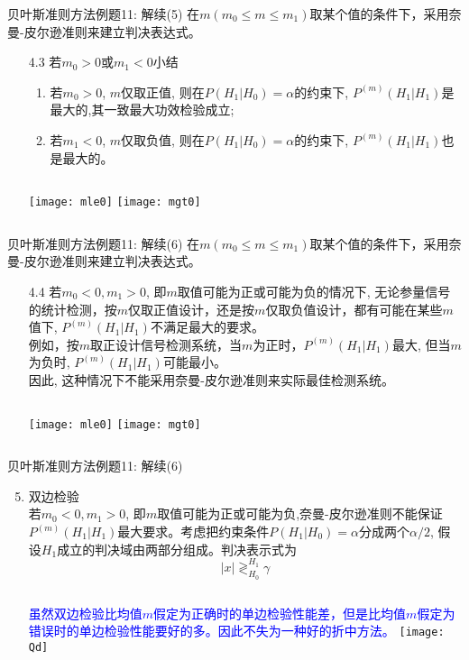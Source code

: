 \begin{frame}[shrink]{贝叶斯准则方法例题11: 解续(5)}
在$m(m_0\le m\le m_1)$取某个值的条件下，采用奈曼-皮尔逊准则来建立判决表达式。
\begin{enumerate}
	\item[4.3] 若$m_0>0$或$m_1<0$小结
	\begin{enumerate}
		\item 若$m_0>0$, $m$仅取正值, 则在$P(H_1|H_0)=\alpha$的约束下, $P^{(m)}(H_1|H_1)$是最大的,其一致最大功效检验成立;
		\item 若$m_1<0$, $m$仅取负值, 则在$P(H_1|H_0)=\alpha$的约束下, $P^{(m)}(H_1|H_1)$也是最大的。
	\end{enumerate}
	\begin{columns}
		\texttt{[image: mle0]}
		\texttt{[image: mgt0]}
	\end{columns}
\end{enumerate} 
\end{frame}

\begin{frame}[shrink]{贝叶斯准则方法例题11: 解续(6)}
在$m(m_0\le m\le m_1)$取某个值的条件下，采用奈曼-皮尔逊准则来建立判决表达式。
\begin{enumerate}
	\item[4.4] 若$m_0<0,m_1>0$, 即$m$取值可能为正或可能为负的情况下, 无论参量信号的统计检测，按$m$仅取正值设计，还是按$m$仅取负值设计，都有可能在某些$m$值下,   $P^{(m)}(H_1|H_1)$不满足最大的要求。\\
	例如，按$m$取正设计信号检测系统，当$m$为正时，$P^{(m)}(H_1|H_1)$最大, 但当$m$为负时, $P^{(m)}(H_1|H_1)$可能最小。\\
	因此, 这种情况下不能采用奈曼-皮尔逊准则来实际最佳检测系统。
	\begin{columns}
		\column{0.4\textwidth}
		\texttt{[image: mle0]}
		\column{0.4\textwidth}
		\texttt{[image: mgt0]}
	\end{columns}
\end{enumerate} 
\end{frame}

\begin{frame}[shrink]{贝叶斯准则方法例题11: 解续(6)}
\begin{enumerate}
	\setcounter{enumi}{4} %
	\item 双边检验\\
	若$m_0<0,m_1>0$, 即$m$取值可能为正或可能为负,奈曼-皮尔逊准则不能保证$P^{(m)}(H_1|H_1)$最大要求。考虑把约束条件$P(H_1|H_0)=\alpha$分成两个$\alpha/2$, 假设$H_1成立$的判决域由两部分组成。判决表示式为
	\[|x|\mathop{\gtrless}_{H_0}^{H_1}\gamma \]
	\begin{columns}
		\column{0.6\textwidth}
		\textcolor{blue}{虽然双边检验比均值$m$假定为正确时的单边检验性能差，但是比均值$m$假定为错误时的单边检验性能要好的多。因此不失为一种好的折中方法。}
		\column{0.3\textwidth}
		\texttt{[image: Qd]}
	\end{columns}
\end{enumerate} 
\end{frame}

